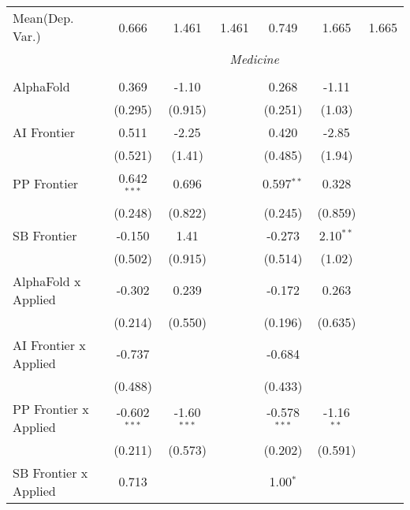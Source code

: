 \begin{tabular}{lcccccc}
Mean(Dep. Var.) & 0.666 & 1.461 & 1.461 & 0.749 & 1.665 & 1.665 \\
 & \multicolumn{6}{c}{\textit{Medicine}} \\ \\
   AlphaFold                      & 0.369          & -1.10         &               & 0.268          & -1.11        &   \\   
                                  & (0.295)        & (0.915)       &               & (0.251)        & (1.03)       &   \\   
   AI Frontier                    & 0.511          & -2.25         &               & 0.420          & -2.85        &   \\   
                                  & (0.521)        & (1.41)        &               & (0.485)        & (1.94)       &   \\   
   PP Frontier                    & 0.642$^{***}$  & 0.696         &               & 0.597$^{**}$   & 0.328        &   \\   
                                  & (0.248)        & (0.822)       &               & (0.245)        & (0.859)      &   \\   
   SB Frontier                    & -0.150         & 1.41          &               & -0.273         & 2.10$^{**}$  &   \\   
                                  & (0.502)        & (0.915)       &               & (0.514)        & (1.02)       &   \\   
   AlphaFold x Applied            & -0.302         & 0.239         &               & -0.172         & 0.263        &   \\   
                                  & (0.214)        & (0.550)       &               & (0.196)        & (0.635)      &   \\   
   AI Frontier x Applied          & -0.737         &               &               & -0.684         &              &   \\   
                                  & (0.488)        &               &               & (0.433)        &              &   \\   
   PP Frontier x Applied          & -0.602$^{***}$ & -1.60$^{***}$ &               & -0.578$^{***}$ & -1.16$^{**}$ &   \\   
                                  & (0.211)        & (0.573)       &               & (0.202)        & (0.591)      &   \\   
   SB Frontier x Applied          & 0.713          &               &               & 1.00$^{*}$     &              &   \\   

\end{tabular}
